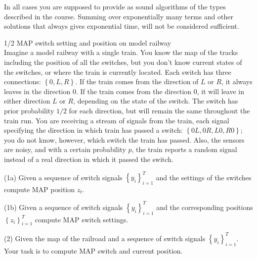 \documentclass[a4paper,twoside=false,abstract=false,numbers=noenddot,
titlepage=false,headings=small,parskip=half,version=last]{scrartcl}
\begin{document}
In all cases you are supposed to provide as sound algorithms of the types
described in the course.
Summing over exponentially many terms and other
solutions that always gives exponential time, will not be considered
sufficient.
\begin{exercise}{1/2} MAP switch setting and position on model railway \\ 
    Imagine a model railway with a single train. You know the map of the tracks
    including the position of all the switches, but you don't know current states
    of the switches, or where the train is currently located. Each switch has three
    connections: $\left\{0,L,R\right\}$. If the train comes from the direction of
    $L$ or $R$, it always
    leaves in the direction $0$. If the train comes from the direction $0$, it will
    leave in either direction $L$ or $R$, depending on the state of the switch. The
    switch has prior probability $1/2$ for each direction, but will remain the same
    throughout the train run. You are receiving a stream of signals from the train,
    each signal specifying the direction in which train has passed a switch: 
    $\left\{0L,0R,L0,R0\right\}$; you do not know, however, 
    which switch the train has passed.
    Also, the sensors are noisy, and with a certain probability $p$, the train
    reports a random signal instead of a real direction in which it passed the
    switch.

    (1a) Given a sequence of switch signals $\left\{y_i\right\}_{i=1}^T$ and the settings of
    the switches compute MAP position $z_t$.

    (1b) Given a sequence of switch signals $\left\{y_i\right\}_{i=1}^T$ and the
    corresponding positions $\left\{z_i\right\}_{i=1}^T$ compute MAP switch settings.

    (2) Given the map of the railroad and a sequence of switch signals
    $\left\{ y_i \right\}_{i=1}^T$. Your task is to compute MAP switch and current
    position.
\end{exercise}
\end{document}
